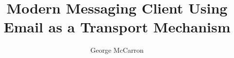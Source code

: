\documentclass[a4paper,12pt,oneside]{report}
\begin{document}
\title{Modern Messaging Client Using Email as a Transport Mechanism}

\author{George McCarron}
\submitdate{\today}

\normallinespacing
\maketitle


\preface
\clearpage
{}



\body








\clearpage
{}
{}


\mediumlinespacing





\end{document}
